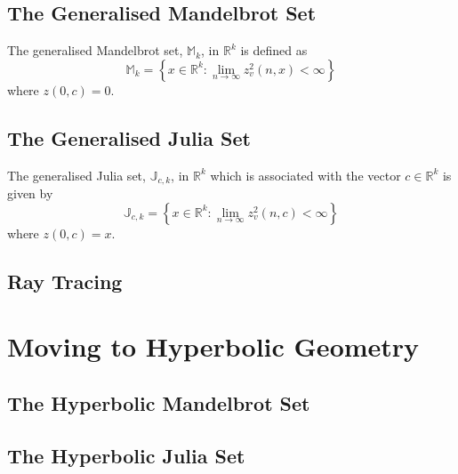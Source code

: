 \subsection{The Generalised Mandelbrot Set}

\begin{definition}
The generalised Mandelbrot set, $\mathbb{M}_k$, in $\mathbb{R}^k$ 
    is defined as
\[
\mathbb{M}_k = 
\left\{x \in \mathbb{R}^k 
: \lim_{n \rightarrow \infty} z_v^2(n,x) < \infty \right\} 
\]
where $z(0,c) = 0$.
\end{definition}

\subsection{The Generalised Julia Set}

\begin{definition}
The generalised Julia set, $\mathbb{J}_{c,k}$, in $\mathbb{R}^k$
which is associated with the vector $c \in \mathbb{R}^k$ is given by
\[
\mathbb{J}_{c,k} = 
\left\{x \in \mathbb{R}^k
: \lim_{n \rightarrow \infty} z_v^2(n,c) < \infty \right\} 
\]
where $z(0,c) = x$.
\end{definition}

\subsection{Ray Tracing}

\section{Moving to Hyperbolic Geometry}

\subsection{The Hyperbolic Mandelbrot Set}

\subsection{The Hyperbolic Julia Set}
